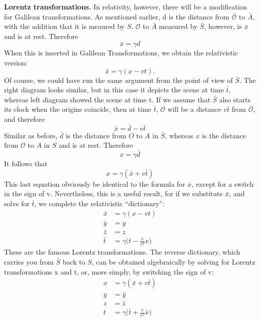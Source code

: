 \documentclass[../../main.tex]{subfiles}
\begin{document}
\textbf{Lorentz transformations.} In relativity, however, there will be a modification for Galilean transformations. As mentioned earlier, d is the distance from $\bar{\mathcal{O}}$ to $\bar{A}$, with the addition that it is meaured by $S$. $ {\mathcal{O}}$ to $\bar{A}$ measured by $\bar{S}$, however, is $\bar{x}$ and is at rest. Therefore
\begin{equation*}
    \bar{x}=\gamma d
\end{equation*}
When this is inserted in Galilean Transformations, we obtain the relativistic version:
\begin{equation*}
    \bar{x} = \gamma (x - vt).
\end{equation*}
Of course, we could have run the same argument from the point of view of $\bar{S}$. The right diagram looks similar, but in this case it depicts the scene at time $\bar{t}$, whereas left diagram showed the scene at time t. If we assume that $\bar{S}$ also starts its clock when the origins coincide, then at time $\bar{t}$, $\mathcal{O}$ will be a distance $v\bar{t}$ from $\bar{\mathcal{O}}$, and therefore
\begin{equation*}
    \bar{x}=\bar{d}-v\bar{t}
\end{equation*}
Similar as before, $\bar{d}$ is the distance from $O$ to $A$ in $\bar{S}$, whereas $x$ is the distance from $\mathcal{O}$ to $A$ in $S$ and is at rest. Therefore
\begin{equation*}
    x=\gamma\bar{d}
\end{equation*}
It follows that
\begin{equation*}
    x=\gamma(\bar{x}+v\bar{t})
\end{equation*}
This last equation obviously be identical to the formula for $\bar{x}$, except for a switch in the sign of v. Nevertheless, this is a useful result, for if we substitute $\bar{x}$, and solve for $\bar{t}$, we complete the relativistic “dictionary”:
\begin{align*}
    \bar{x} &= \gamma (x - vt)\\
    \bar{y} &= y\\
    \bar{z} &= z\\
    \bar{t}&=\gamma\biggl(t-\frac{v}{c^2}x\biggr)
\end{align*}
These are the famous Lorentz transformations. The reverse dictionary, which carries you from $\bar{S}$ back to $S$, can be obtained algebraically by solving for Lorentz transformations x and t, or, more simply, by switching the sign of v:
\begin{align*}
    x &= \gamma (\bar{x}+ v\bar{t})\\
    y &= \bar{y}\\
    z &= \bar{z}\\
    t&=\gamma\biggl(\bar{t}+ \frac{v}{c^2}\bar{x}\biggr)
\end{align*}
\end{document}
